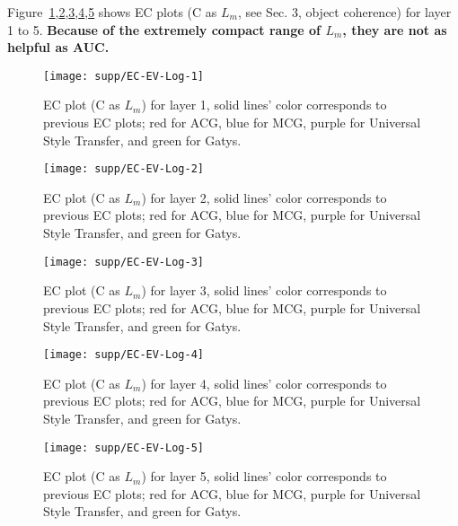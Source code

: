 Figure~\ref{ECL1},\ref{ECL2},\ref{ECL3},\ref{ECL4},\ref{ECL5} shows EC plots (C as $L_m$, see Sec. 3, object coherence) for layer 1 to 5.
 {\bf Because of the extremely compact range of $L_m$, they are not as helpful as AUC.} 



\begin{figure}
\centering
\texttt{[image: supp/EC-EV-Log-1]}
\caption{EC plot (C as $L_m$) for layer 1, solid lines' color corresponds to previous EC plots; red for ACG, blue for MCG, purple for Universal Style Transfer, and green for Gatys.  }
\label{ECL1}
\end{figure}

\begin{figure}
\centering
\texttt{[image: supp/EC-EV-Log-2]}
\caption{EC plot (C as $L_m$) for layer 2, solid lines' color corresponds to previous EC plots; red for ACG, blue for MCG, purple for Universal Style Transfer, and green for Gatys. }
\label{ECL2}
\end{figure}

\begin{figure}
\centering
\texttt{[image: supp/EC-EV-Log-3]}
\caption{EC plot (C as $L_m$) for layer 3, solid lines' color corresponds to previous EC plots; red for ACG, blue for MCG, purple for Universal Style Transfer, and green for Gatys. }
\label{ECL3}
\end{figure}


\begin{figure}
\centering
\texttt{[image: supp/EC-EV-Log-4]}
\caption{EC plot (C as $L_m$) for layer 4, solid lines' color corresponds to previous EC plots; red for ACG, blue for MCG, purple for Universal Style Transfer, and green for Gatys. }
\label{ECL4}
\end{figure}

\begin{figure}
\centering
\texttt{[image: supp/EC-EV-Log-5]}
\caption{EC plot (C as $L_m$) for layer 5, solid lines' color corresponds to previous EC plots; red for ACG, blue for MCG, purple for Universal Style Transfer, and green for Gatys. }
\label{ECL5}
\end{figure}






\FloatBarrier